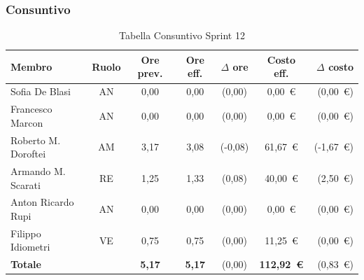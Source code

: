 \subsubsection{Consuntivo}
\begin{table}[H]
    \centering
    \renewcommand{\arraystretch}{1.3}
    \begin{tabularx}{\textwidth}{|X|c|c|c|c|c|r|}
        \hline
        \textbf{Membro} & \textbf{Ruolo} & \textbf{Ore prev.} &
        \textbf{Ore eff.} & \textbf{$\Delta$ ore} &
        \textbf{Costo eff.} & \textbf{$\Delta$ costo} \\
        \hline
        Sofia De Blasi       & AN & 0,00 & 0,00 & {\color{green}(0,00)}  & 0{,}00~\euro & {\color{green}(0{,}00~\euro)} \\
        Francesco Marcon     & AN & 0,00 & 0,00 & {\color{green}(0,00)} & 0{,}00~\euro  & {\color{green}(0{,}00~\euro)} \\
        Roberto M. Doroftei  & AM & 3,17 & 3,08 & {\color{green}(-0,08)} & 61{,}67~\euro  & {\color{green}(-1{,}67~\euro)} \\
        Armando M. Scarati   & RE & 1,25 & 1,33 & {\color{red}(0,08)}  & 40{,}00~\euro  & {\color{red}(2{,}50~\euro)} \\
        Anton Ricardo Rupi   & AN & 0,00 & 0,00 & {\color{green}(0,00)}  & 0{,}00~\euro & {\color{green}(0{,}00~\euro)} \\
        Filippo Idiometri    & VE & 0,75 & 0,75 & {\color{green}(0,00)} & 11{,}25~\euro  & {\color{green}(0{,}00~\euro)} \\
        \hline
        \textbf{Totale} & & \textbf{5,17} & \textbf{5,17} & {\color{green}(0,00)} & \textbf{112{,}92~\euro} & {\color{red}(0{,}83~\euro)} \\
        \hline
    \end{tabularx}
    \caption{Tabella Consuntivo Sprint 12}
\end{table}

